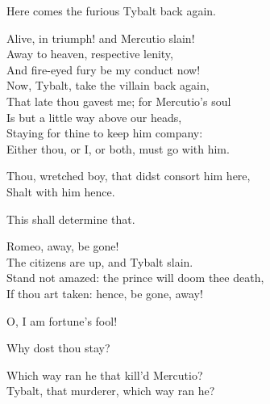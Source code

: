 \begin{speech}
Here comes the furious Tybalt back again. \\
\end{speech}
\begin{speech}
Alive, in triumph! and Mercutio slain! \\
Away to heaven, respective lenity, \\
And fire-eyed fury be my conduct now!  \\

Now, Tybalt, take the villain back again, \\
That late thou gavest me; for Mercutio's soul \\
Is but a little way above our heads, \\
Staying for thine to keep him company: \\
Either thou, or I, or both, must go with him. \\
\end{speech}
\begin{speech}
Thou, wretched boy, that didst consort him here, \\

Shalt with him hence. \\
\end{speech}
\begin{speech}
This shall determine that. 
\\
\end{speech}
\begin{speech}
Romeo, away, be gone! \\
The citizens are up, and Tybalt slain. \\
Stand not amazed: the prince will doom thee death, \\
If thou art taken: hence, be gone, away! \\
\end{speech}
\begin{speech}
O, I am fortune's fool! \\
\end{speech}
\begin{speech}
Why dost thou stay?  
\\
\end{speech}
\begin{speech}
Which way ran he that kill'd Mercutio? \\
Tybalt, that murderer, which way ran he? \\
\end{speech}
